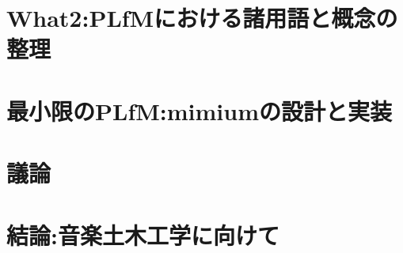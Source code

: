 \documentclass[dvipdfmx,a4paper,openany]{jsbook}
\begin{document}
\chapter{What2:PLfMにおける諸用語と概念の整理}


\chapter{最小限のPLfM:mimiumの設計と実装}


\chapter{議論}


\chapter{結論:音楽土木工学に向けて}


\printbibliography[title = 参考文献]
\end{document}
